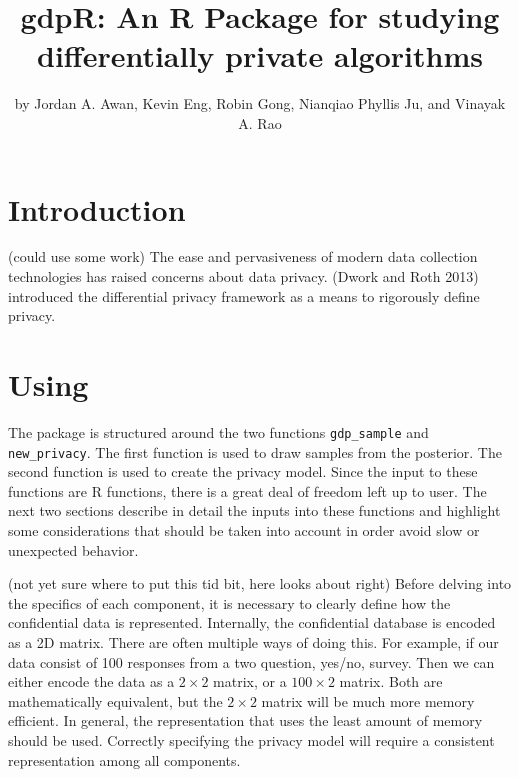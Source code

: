 \title{gdpR: An R Package for studying differentially private algorithms}


\author{by Jordan A. Awan, Kevin Eng, Robin Gong, Nianqiao Phyllis Ju, and Vinayak A. Rao}

\maketitle


\hypertarget{introduction}{%
\section{Introduction}\label{introduction}}

(could use some work)
The ease and pervasiveness of modern data collection technologies has raised
concerns about data privacy. (Dwork and Roth 2013) introduced the differential privacy
framework as a means to rigorously define privacy.

\hypertarget{using}{%
\section{\texorpdfstring{Using }{Using }}\label{using}}

The package is structured around the two functions \texttt{gdp\_sample} and
\texttt{new\_privacy}. The first function is used to draw samples from the
posterior. The second function is used to create the privacy model. Since the
input to these functions are R functions, there is a great deal of freedom
left up to user. The next two sections describe in detail the inputs into
these functions and highlight some considerations that should be taken
into account in order avoid slow or unexpected behavior.

(not yet sure where to put this tid bit, here looks about right)
Before delving into the specifics of each component, it is necessary to clearly
define how the confidential data is represented. Internally, the
confidential database is encoded as a 2D matrix. There are often multiple ways
of doing this. For example, if our data consist
of 100 responses from a two question, yes/no, survey. Then we can either encode
the data as a \(2 \times 2\) matrix, or a \(100 \times 2\) matrix. Both are mathematically
equivalent, but the \(2 \times 2\) matrix will be much more memory efficient.
In general, the representation that uses the least amount of memory should be
used. Correctly specifying the privacy model will require a consistent
representation among all components.

